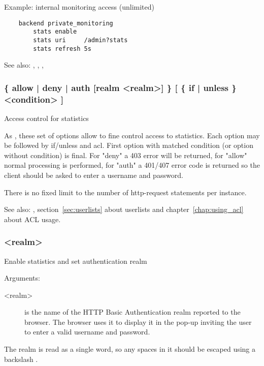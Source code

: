    Example: internal monitoring access (unlimited)
   \begin{verbatim}
    backend private_monitoring
        stats enable
        stats uri     /admin?stats
        stats refresh 5s
   \end{verbatim}


See also: , , , 

\subsubsection[stats http-request]{ \{ allow | deny | auth [realm <realm>] \} [ \{ if | unless \} <condition> ]}

  Access control for statistics


  As , these set of options allow to fine control access to
  statistics. Each option may be followed by if/unless and acl.
  First option with matched condition (or option without condition) is final.
  For "deny" a 403 error will be returned, for "allow" normal processing is
  performed, for "auth" a 401/407 error code is returned so the client
  should be asked to enter a username and password.

  There is no fixed limit to the number of http-request statements per
  instance.


See also: , section~\ref{sec:userlists} about userlists and chapter~\ref{chap:using_acl}
             about ACL usage.

\subsubsection[stats realm]{ <realm>}

  Enable statistics and set authentication realm


  Arguments:
  \begin{description}
  \item[<realm>] is the name of the HTTP Basic Authentication realm reported to
              the browser. The browser uses it to display it in the pop-up
              inviting the user to enter a valid username and password.
  \end{description}

  The realm is read as a single word, so any spaces in it should be escaped
  using a backslash \chr{\bslash}.

